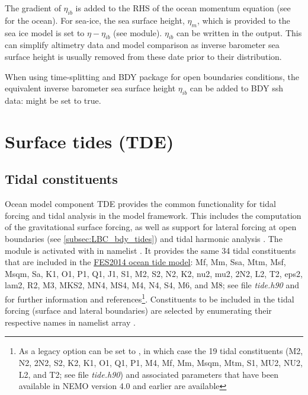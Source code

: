 \documentclass[../main/NEMO_manual]{subfiles}
\begin{document}
The gradient of $\eta_{ib}$ is added to the RHS of the ocean momentum equation (see  for the ocean).
For sea-ice, the sea surface height, $\eta_m$, which is provided to the sea ice model is set to $\eta - \eta_{ib}$
(see  module).
$\eta_{ib}$ can be written in the output.
This can simplify altimetry data and model comparison as
inverse barometer sea surface height is usually removed from these date prior to their distribution.

When using time-splitting and BDY package for open boundaries conditions,
the equivalent inverse barometer sea surface height $\eta_{ib}$ can be added to BDY ssh data:
  might be set to true.

\section{Surface tides (TDE)}
\label{sec:SBC_TDE}

\begin{listing}
  \caption{}
  \label{lst:nam_tide}
\end{listing}

\subsection{Tidal constituents}
Ocean model component TDE provides the common functionality for tidal forcing
and tidal analysis in the model framework. This includes the computation of the gravitational
surface forcing, as well as support for lateral forcing at open boundaries (see
\autoref{subsec:LBC_bdy_tides}) and tidal harmonic analysis \iffalse (see
\autoref{subsec:DIA_diamlr?} and \autoref{subsec:DIA_diadetide?}) \fi . The module is
activated with  in namelist
. It provides the same 34 tidal constituents that are
included in the
\href{https://www.aviso.altimetry.fr/en/data/products/auxiliary-products/global-tide-fes.html}{FES2014
  ocean tide model}: Mf, Mm, Ssa, Mtm, Msf, Msqm, Sa, K1, O1, P1, Q1, J1, S1,
M2, S2, N2, K2, nu2, mu2, 2N2, L2, T2, eps2, lam2, R2, M3, MKS2, MN4, MS4, M4,
N4, S4, M6, and M8; see file \textit{tide.h90} and  for further
information and references\footnote{As a legacy option  can be
  set to , in which case the 19 tidal constituents (M2, N2, 2N2, S2,
  K2, K1, O1, Q1, P1, M4, Mf, Mm, Msqm, Mtm, S1, MU2, NU2, L2, and T2; see file
  \textit{tide.h90}) and associated parameters that have been available in NEMO version
  4.0 and earlier are available}. Constituents to be included in the tidal forcing
(surface and lateral boundaries) are selected by enumerating their respective
names in namelist array .\par
\end{document}
